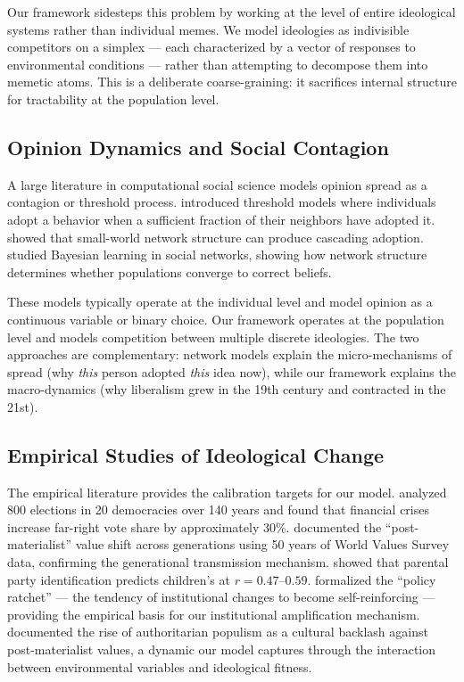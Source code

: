 Our framework sidesteps this problem by working at the level of entire
ideological systems rather than individual memes. We model ideologies as
indivisible competitors on a simplex --- each characterized by a vector of
responses to environmental conditions --- rather than attempting to decompose
them into memetic atoms. This is a deliberate coarse-graining: it sacrifices
internal structure for tractability at the population level.

\subsection{Opinion Dynamics and Social Contagion}

A large literature in computational social science models opinion spread as a
contagion or threshold process. \citet{granovetter1978threshold} introduced
threshold models where individuals adopt a behavior when a sufficient
fraction of their neighbors have adopted it. \citet{watts1998collective}
showed that small-world network structure can produce cascading adoption.
\citet{acemoglu2011bayesian} studied Bayesian learning in social networks,
showing how network structure determines whether populations converge to
correct beliefs.

These models typically operate at the individual level and model opinion as a
continuous variable or binary choice. Our framework operates at the
population level and models competition between multiple discrete ideologies.
The two approaches are complementary: network models explain the
micro-mechanisms of spread (why \emph{this} person adopted \emph{this} idea
now), while our framework explains the macro-dynamics (why liberalism grew
in the 19th century and contracted in the 21st).

\subsection{Empirical Studies of Ideological Change}

The empirical literature provides the calibration targets for our model.
\citet{funke2016going} analyzed 800 elections in 20 democracies over 140
years and found that financial crises increase far-right vote share by
approximately 30\%. \citet{inglehart1997modernization} documented the
``post-materialist'' value shift across generations using 50 years of World
Values Survey data, confirming the generational transmission mechanism.
\citet{jennings1968transmission} showed that parental party identification
predicts children's at $r = 0.47$--$0.59$. \citet{pierson2000increasing}
formalized the ``policy ratchet'' --- the tendency of institutional changes
to become self-reinforcing --- providing the empirical basis for our
institutional amplification mechanism. \citet{norris2019cultural}
documented the rise of authoritarian populism as a cultural backlash against
post-materialist values, a dynamic our model captures through the
interaction between environmental variables and ideological fitness.

